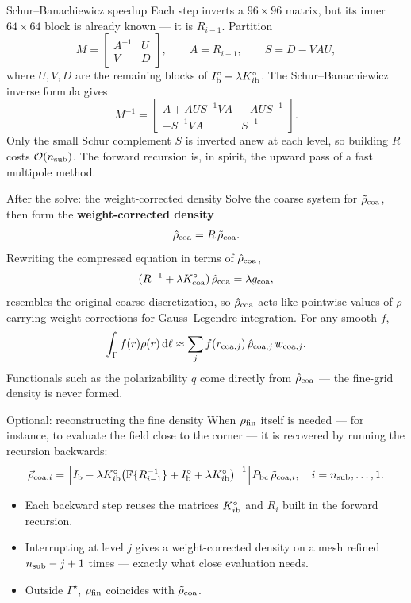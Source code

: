 \documentclass[aspectratio=169,11pt]{beamer}
\newcommand{\cO}{\mathcal{O}}
\newcommand{\dd}{\,\mathrm d}
\newcommand{\hl}[1]{{\color{CCMorange}\textbf{#1}}}
\begin{document}
\begin{frame}{Schur--Banachiewicz speedup}
\small
Each step inverts a $96\times96$ matrix, but its inner $64\times64$ block is
already known --- it is $R_{i-1}$.  Partition
\[
  M=\begin{bmatrix}A^{-1}&U\\ V&D\end{bmatrix},\qquad
  A=R_{i-1},\qquad S=D-VAU,
\]
where $U,V,D$ are the remaining blocks of
$I_{\rm b}^\circ+\lambda K^\circ_{i{\rm b}}$.  The Schur--Banachiewicz inverse
formula gives
\[
  M^{-1}=
  \begin{bmatrix}
  A+AUS^{-1}VA & -AUS^{-1}\\[2pt]
  -S^{-1}VA & S^{-1}
  \end{bmatrix}.
\]
Only the small Schur complement $S$ is inverted anew at each level, so building
$R$ costs $\cO(n_{\rm sub})$.  The forward recursion is, in spirit, the upward
pass of a fast multipole method.
\end{frame}

\begin{frame}{After the solve: the weight-corrected density}
\small
Solve the coarse system for $\tilde\rho_{\rm coa}$, then form the
\hl{weight-corrected density}
\[
  \hat\rho_{\rm coa}=R\,\tilde\rho_{\rm coa}.
\]
Rewriting the compressed equation in terms of $\hat\rho_{\rm coa}$,
\[
  (R^{-1}+\lambda K^\circ_{\rm coa})\,\hat\rho_{\rm coa}=\lambda g_{\rm coa},
\]
resembles the original coarse discretization, so $\hat\rho_{\rm coa}$ acts like
pointwise values of $\rho$ carrying weight corrections for Gauss--Legendre
integration.  For any smooth $f$,
\[
  \int_\Gamma f(r)\rho(r)\dd\ell
  \approx\sum_j f(r_{{\rm coa},j})\,\hat\rho_{{\rm coa},j}\,w_{{\rm coa},j}.
\]
Functionals such as the polarizability $q$ come directly from
$\hat\rho_{\rm coa}$ --- the fine-grid density is never formed.
\end{frame}

\begin{frame}{Optional: reconstructing the fine density}
\small
When $\rho_{\rm fin}$ itself is needed --- for instance, to evaluate the field
close to the corner --- it is recovered by running the recursion backwards:
\[
  \vec\rho_{{\rm coa},i}=
  \Bigl[I_{\rm b}-\lambda K^\circ_{i{\rm b}}
  \bigl(\mathbb{F}\{R_{i-1}^{-1}\}+I_{\rm b}^\circ+\lambda K^\circ_{i{\rm b}}\bigr)^{-1}\Bigr]
  P_{\rm bc}\,\tilde\rho_{{\rm coa},i},
  \quad i=n_{\rm sub},\ldots,1.
\]
\begin{itemize}
  \item Each backward step reuses the matrices $K^\circ_{i{\rm b}}$ and $R_i$
  built in the forward recursion.
  \item Interrupting at level $j$ gives a weight-corrected density on a mesh
  refined $n_{\rm sub}-j+1$ times --- exactly what close evaluation needs.
  \item Outside $\Gamma^\star$, $\rho_{\rm fin}$ coincides with
  $\tilde\rho_{\rm coa}$.
\end{itemize}
\end{frame}
\end{document}
